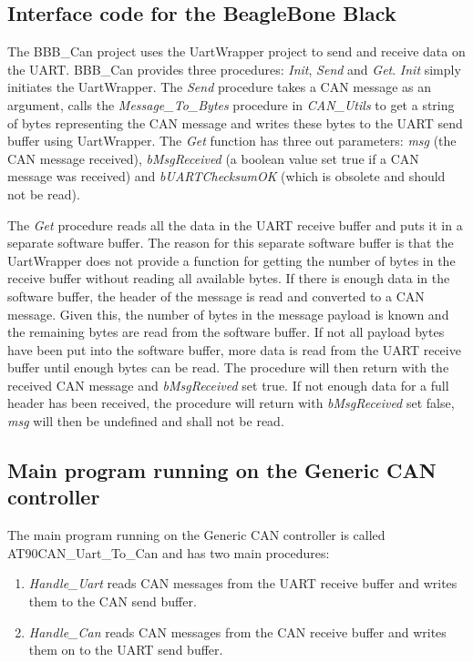 \subsection{Interface code for the BeagleBone Black}
The BBB\_Can project uses the UartWrapper project to send and receive data on the UART. BBB\_Can provides three procedures: \emph{Init}, \emph{Send} and \emph{Get}. \newline
\emph{Init} simply initiates the UartWrapper. \newline
The \emph{Send} procedure takes a CAN message as an argument, calls the \emph{Message\_To\_Bytes} procedure in \emph{CAN\_Utils} to get a string of bytes representing the CAN message and writes these bytes to the UART send buffer using UartWrapper. \newline
The \emph{Get} function has three out parameters: \emph{msg} (the CAN message received), \emph{bMsgReceived} (a boolean value set true if a CAN message was received) and \emph{bUARTChecksumOK} (which is obsolete and should not be read). 

The \emph{Get} procedure reads all the data in the UART receive buffer and puts it in a separate software buffer. The reason for this separate software buffer is that the UartWrapper does not provide a function for getting the number of bytes in the receive buffer without reading all available bytes. \newline
If there is enough data in the software buffer, the header of the message is read and converted to a CAN message. Given this, the number of bytes in the message payload is known and the remaining bytes are read from the software buffer. If not all payload bytes have been put into the software buffer, more data is read from the UART receive buffer until enough bytes can be read. The procedure will then return with the received CAN message and \emph{bMsgReceived} set true. \newline
If not enough data for a full header has been received, the procedure will return with \emph{bMsgReceived} set false, \emph{msg} will then be undefined and shall not be read.


\subsection{Main program running on the Generic CAN controller}
The main program running on the Generic CAN controller is called AT90CAN\_Uart\_To\_Can and has two main procedures:

\begin{enumerate}
   \item { \em Handle\_Uart}
   reads CAN messages from the UART receive buffer and writes them to the CAN send buffer.
   \item { \em Handle\_Can}
   reads CAN messages from the CAN receive buffer and writes them on to the UART send buffer.
\end{enumerate}


